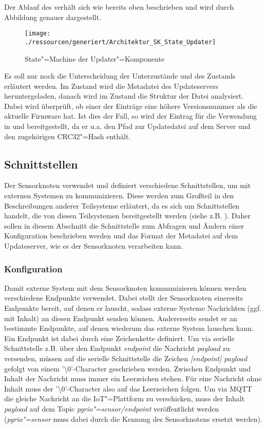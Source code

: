 Der Ablauf des  verhält sich wie bereits oben beschrieben und wird durch Abbildung  genauer dargestellt.

\begin{figure}[!htb]
    \centering
    \texttt{[image: ./ressourcen/generiert/Architektur\_SK\_State\_Updater]}
    \caption{State"=Machine der Updater"=Komponente}
    \label{fig:Architektur_SK_State_Updater}
\end{figure}

Es soll nur noch die Unterscheidung der Unterzustände  und  des Zustands  erläutert werden.
Im Zustand  wird die Metadatei des Updateservers heruntergeladen, danach wird im Zustand  die Struktur der Datei analysiert.
Dabei wird überprüft, ob einer der Einträge eine höhere Versionsnummer als die aktuelle Firmware hat.
Ist dies der Fall, so wird der Eintrag für die Verwendung in  und  bereitgestellt, da er u.a. den Pfad zur Updatedatei auf dem Server und den zugehörigen CRC32"=Hash enthält.

\subsection{Schnittstellen}
Der Sensorknoten verwendet und definiert verschiedene Schnittstellen, um mit externen Systemen zu kommunizieren.
Diese werden zum Großteil in den Beschreibungen anderer Teilsysteme erläutert, da es sich um Schnittstellen handelt, die von diesen Teilsystemen bereitgestellt werden (siehe z.B. ).
Daher sollen in diesem Abschnitt die Schnittstelle zum Abfragen und Ändern einer Konfiguration beschrieben werden und das Format der Metadatei auf dem Updateserver, wie es der Sensorknoten verarbeiten kann.

\subsubsection{Konfiguration}
Damit externe System mit dem Sensorknoten kommunizieren können werden verschiedene Endpunkte verwendet.
Dabei stellt der Sensorknoten einerseits Endpunkte bereit, auf denen er lauscht, sodass externe Systeme Nachrichten (ggf. mit Inhalt) an diesen Endpunkt senden können.
Andererseits sendet er an bestimmte Endpunkte, auf denen wiederum das externe System lauschen kann.
Ein Endpunkt ist dabei durch eine Zeichenkette definiert.
Um via serielle Schnittstelle z.B. über den Endpunkt \textit{endpoint} die Nachricht \textit{payload} zu versenden, müssen auf die serielle Schnittstelle die Zeichen \textit{[endpoint] payload} gefolgt von einem '\textbackslash0'-Character geschrieben werden.
Zwischen Endpunkt und Inhalt der Nachricht muss immer ein Leerzeichen stehen.
Für eine Nachricht ohne Inhalt muss der '\textbackslash0'-Character also auf das Leerzeichen folgen.
Um via MQTT die gleiche Nachricht an die IoT"=Plattform zu verschicken, muss der Inhalt \textit{payload} auf dem Topic \textit{pgrio"=sensor/endpoint} veröffentlicht werden (\textit{pgrio"=sensor} muss dabei durch die Kennung des Sensorknotens ersetzt werden).

